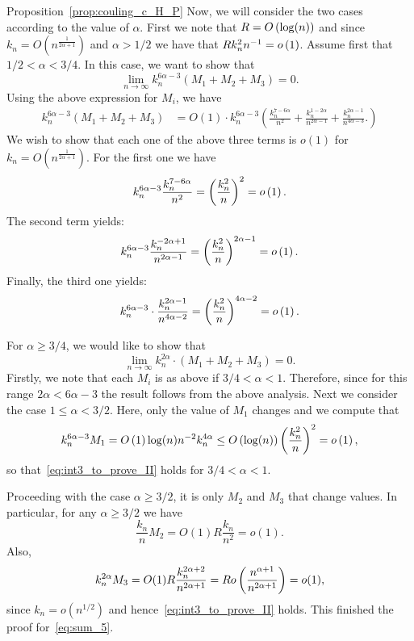 \begin{proofof}{Proposition~\ref{prop:couling_c_H_P}}
Now, we will consider the two cases according to the value of $\alpha$. First we note that $R = O\left(\log(n)\right)$ and since
$k_n = O(n^{\frac{1}{2\alpha +1}})$ and $\alpha > 1/2$ we have that $R k_n^2 n^{-1} = o\left(1\right)$.
Assume first that $1/2 < \alpha < 3/4$. In this case, we want to show that 
\begin{equation} \label{eq:int3_to_prove_I}
\lim_{n \to \infty} k_n^{6\alpha -3} (M_1 + M_2 + M_3) = 0. 
\end{equation}
Using the above expression for $M_i$, we have 
\begin{align*} 
 k_n^{6\alpha -3} (M_1 + M_2 + M_3) &= O(1) \cdot  
 k_n^{6\alpha -3} 
\left( 
\frac{k_n^{7-6\alpha}}{n^2} + \frac{k_n^{1-2\alpha}}{n^{2\alpha-1}} 
+\frac{k_n^{2\alpha-1}}{n^{4\alpha - 3}}.
\right) 
\end{align*}
We wish to show that each one of the above three terms is $o(1)$ for $k_n = O(n^{\frac{1}{2\alpha +1}})$. 
For the first one we have 
\[ 
	k_n^{6\alpha -3} \frac{k_n^{7-6\alpha}}{n^2} = \left(\frac{k_n^{2}}{n}\right)^2 = o\left(1\right). 
\]
The second term yields: 
\[
	k_n^{6\alpha -3}  \frac{k_n^{-2\alpha+1}}{n^{2\alpha-1}} = \left(\frac{k_n^2}{n}\right)^{2\alpha - 1} = o\left(1\right).
\]
Finally, the third one yields: 
\[
	k_n^{6\alpha -3} \cdot \frac{k_n^{2\alpha -1}}{n^{4\alpha - 2}}  
	= \left(\frac{k_n^2}{n}\right)^{4\alpha - 2} = o\left(1\right).
\]
 
For $\alpha \ge 3/4$, we would like to show that 
\begin{equation} \label{eq:int3_to_prove_II}
\lim_{n \to \infty} k_n^{2\alpha} \cdot (M_1 + M_2 + M_3) = 0. 
\end{equation}
Firstly, we note that each $M_i$ is as above if $3/4 < \alpha < 1$. Therefore, since for this range $2 \alpha <6\alpha - 3$ the result follows from the above analysis. Next we consider the case $1 \le \alpha < 3/2$. Here, only the value of $M_1$ changes and we compute that
\[
	k_n^{6\alpha - 3} M_1 = O\left(1\right) \log(n) n^{-2} k_n^{4\alpha} \le O\left(\log(n)\right) \left(\frac{k_n^2}{n}\right)^2 = o\left(1\right),
\]
so that~\eqref{eq:int3_to_prove_II} holds for $3/4 < \alpha < 1$.

Proceeding with the case $\alpha \ge 3/2$, it is only $M_2$ and $M_3$ that change values. In particular, for any $\alpha \geq 3/2$ we have 
\[
	\frac{k_n}{n}  M_2 =O(1) R \frac{k_n}{n^2} = o(1).
\]
Also,
\[
	k_n^{2\alpha }  M_3 = O(1) R \frac{k_n^{2\alpha + 2}}{n^{2\alpha + 1}}
	= R o\left(\frac{n^{\alpha + 1}}{n^{2\alpha +1}}\right) = o(1),
\]
since $k_n = o(n^{1/2})$ and hence~\eqref{eq:int3_to_prove_II} holds. This finished the proof for~\eqref{eq:sum_5}.




\end{proofof}
